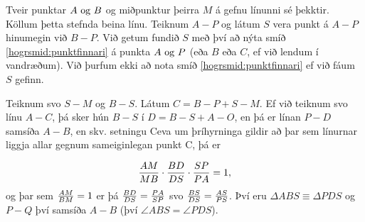 \begin{frame}[allowframebreaks]
  \begin{hogrsmid} \label{hogrsmid:samsidastefndri}
    Tveir punktar \(A \text{ og } B\) og miðpunktur þeirra \(M\) á gefnu línunni sé þekktir.
    Köllum þetta stefnda beina línu.
    Teiknum \(A-P\) og látum \(S\) vera punkt á \(A-P\) hinumegin við \(B-P\).
    Við getum fundið \(S\) með því að nýta smíð \ref{hogrsmid:punktfinnari}
    á punkta \(A \text{ og } P\) (eða \(B\) eða \(C\), ef við lendum í vandræðum).
    Við þurfum ekki að nota smíð \ref{hogrsmid:punktfinnari} ef við fáum
    \(S\) gefinn.

    \theorembreak
    Teiknum svo \(S-M\) og \(B-S\). Látum \(C = B-P+ S-M\).
    Ef við teiknum svo línu \(A-C\), þá sker hún \(B-S\) í
    \(D = B-S + A-O\), en þá er línan \(P-D\) samsíða \(A-B\),
    en skv. setningu Ceva um þríhyrninga gildir \cite{WikiCeva} að þar sem
    línurnar liggja allar gegnum sameiginlegan punkt C, þá er
    
    \[\frac{AM}{MB} \cdot \frac{BD}{DS} \cdot \frac{SP}{PA} = 1,\]
    og þar sem \(\frac{AM}{BM} = 1\) er þá  \(\frac{BD}{DS}= \frac{PA}{SP} \)
    svo \(\frac{BS}{DS}=\frac{AS}{PS}\). Því eru \(\Delta ABS \equiv \Delta PDS\)
    og \(P-Q\) því samsíða \(A-B\) (því \(\angle ABS = \angle PDS\)).
  \end{hogrsmid}
\end{frame}

